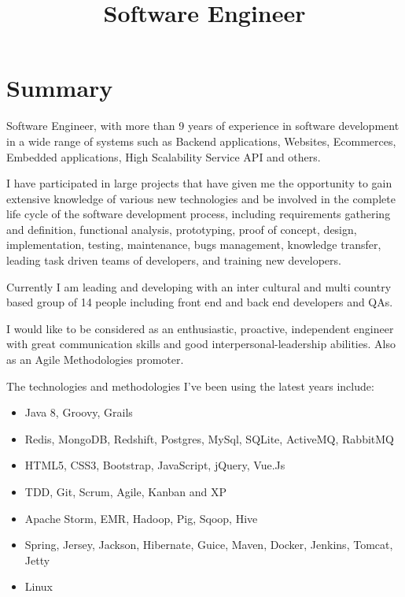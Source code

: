 \documentclass[11pt,a4paper,sans]{moderncv}        %
\title{Software Engineer}                               %
\begin{document}
\makecvtitle

\section{Summary}
Software Engineer, with more than 9 years of experience in software development in a wide range of systems 
such as Backend applications, Websites, Ecommerces, Embedded applications, High Scalability Service API and
others.

\medskip I have participated in large projects that have given me the opportunity to gain extensive knowledge of various new
technologies and be involved in the complete life cycle of the software development process, including requirements
gathering and definition, functional analysis, prototyping, proof of concept, design, implementation, testing,
maintenance, bugs management, knowledge transfer, leading task driven teams of developers, and training new
developers.

\medskip Currently I am leading and developing with an inter cultural and multi country based group of 14 people including front end and back end developers and QAs.

\medskip I would like to be considered as an enthusiastic, proactive, independent engineer with great communication skills
and good interpersonal-leadership abilities. Also as an Agile Methodologies promoter.

\medskip The technologies and methodologies I've been using the latest years include:
\linebreak
\begin{itemize}
	  \item Java 8, Groovy, Grails
	  \item Redis, MongoDB, Redshift, Postgres, MySql, SQLite, ActiveMQ, RabbitMQ
	  \item HTML5, CSS3, Bootstrap, JavaScript, jQuery, Vue.Js
	  \item TDD, Git, Scrum, Agile, Kanban and XP
	  \item Apache Storm, EMR, Hadoop, Pig, Sqoop, Hive
	  \item Spring, Jersey, Jackson, Hibernate, Guice, Maven, Docker, Jenkins, Tomcat, Jetty
	  \item Linux
\end{itemize}
\clearpage
\end{document}
